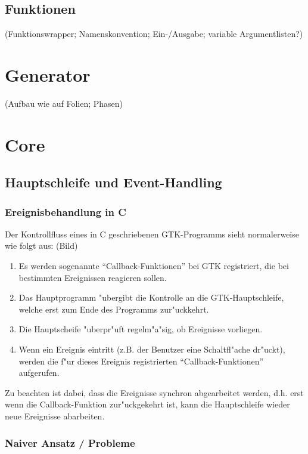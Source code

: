 \documentclass{article}
\begin{document}
\subsection{Funktionen}

(Funktionswrapper; Namenskonvention; Ein-/Ausgabe; variable Argumentlisten?)

\section{Generator}

(Aufbau wie auf Folien; Phasen)

\section{Core}

\subsection{Hauptschleife und Event-Handling}

\subsubsection{Ereignisbehandlung in C}

Der Kontrollfluss eines in C geschriebenen GTK-Programms sieht normalerweise
wie folgt aus: (Bild)

\begin{enumerate}
\item Es werden sogenannte ``Callback-Funktionen'' bei GTK registriert, die
      bei bestimmten Ereignissen reagieren sollen.
\item Das Hauptprogramm "ubergibt die Kontrolle an die GTK-Hauptschleife,
      welche erst zum Ende des Programms zur"uckkehrt.
\item Die Hauptscheife "uberpr"uft regelm"a"sig, ob Ereignisse vorliegen.
\item Wenn ein Ereignis eintritt (z.B. der Benutzer eine Schaltfl"ache 
      dr"uckt), werden die f"ur dieses Ereignis registrierten
      ``Callback-Funktionen'' aufgerufen.
\end{enumerate}

Zu beachten ist dabei, dass die Ereignisse synchron abgearbeitet werden,
d.h. erst wenn die Callback-Funktion zur"uckgekehrt ist, kann die Hauptschleife
wieder neue Ereignisse abarbeiten.


\subsubsection{Naiver Ansatz / Probleme}
\end{document}
